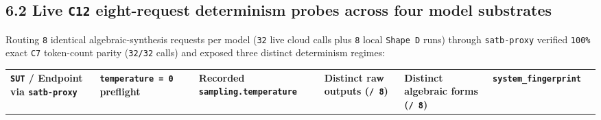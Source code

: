 \documentclass[10pt,letterpaper]{article}
\begin{document}
\subsection{\texorpdfstring{6.2 Live \texttt{C12} eight-request
determinism probes across four model
substrates}{6.2 Live C12 eight-request determinism probes across four model substrates}}\label{live-c12-eight-request-determinism-probes-across-four-model-substrates}

Routing \texttt{8} identical algebraic-synthesis requests per model
(\texttt{32} live cloud calls plus \texttt{8} local \texttt{Shape\ D}
runs) through \texttt{satb-\allowbreak{}proxy} verified \texttt{100\%} exact
\texttt{C7} token-count parity (\texttt{32/32} calls) and exposed three
distinct determinism regimes:

{\scriptsize\setlength{\tabcolsep}{3.0pt}\renewcommand{\arraystretch}{1.14}
\begin{longtable}[]{@{}
  >{\raggedright\arraybackslash}p{}
  >{\centering\arraybackslash}p{}
  >{\raggedright\arraybackslash}p{}
  >{\centering\arraybackslash}p{}
  >{\centering\arraybackslash}p{}
  >{\raggedright\arraybackslash}p{}
  >{\raggedleft\arraybackslash}p{}@{}}
\toprule\noalign{}
\begin{minipage}[b]{\linewidth}\raggedright
\textbf{\texttt{SUT} / Endpoint via \texttt{satb-\allowbreak{}proxy}}
\end{minipage} & \begin{minipage}[b]{\linewidth}\centering
\textbf{\texttt{temperature\ =\ 0} preflight}
\end{minipage} & \begin{minipage}[b]{\linewidth}\raggedright
\textbf{Recorded \texttt{sampling.\allowbreak{}temperature}}
\end{minipage} & \begin{minipage}[b]{\linewidth}\centering
\textbf{Distinct raw outputs (\texttt{/\ 8})}
\end{minipage} & \begin{minipage}[b]{\linewidth}\centering
\textbf{Distinct algebraic forms (\texttt{/\ 8})}
\end{minipage} & \begin{minipage}[b]{\linewidth}\raggedright
\textbf{\texttt{system\_\allowbreak{}fingerprint}}

\end{minipage}
\end{longtable}}
\end{document}
